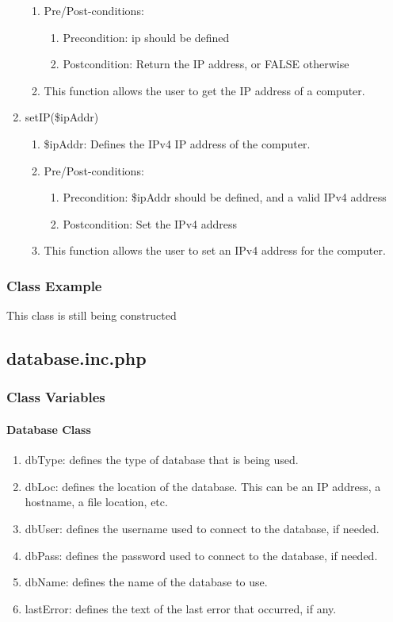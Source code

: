 \documentclass{article}
\begin{document}
\begin{enumerate}
\begin{enumerate}
\item Pre/Post-conditions:
\begin{enumerate}
\item Precondition: ip should be defined
\item Postcondition: Return the IP address, or FALSE otherwise
\end{enumerate}
\item This function allows the user to get the IP address of a computer.
\end{enumerate}
\item setIP(\$ipAddr)
\begin{enumerate}
\item \$ipAddr: Defines the IPv4 IP address of the computer.
\item Pre/Post-conditions:
\begin{enumerate}
\item Precondition: \$ipAddr should be defined, and a valid IPv4 address
\item Postcondition: Set the IPv4 address
\end{enumerate}
\item This function allows the user to set an IPv4 address for the computer.
\end{enumerate}
\end{enumerate}

\newpage

\subsubsection{Class Example}
This class is still being constructed

\newpage

\subsection{database.inc.php}
\subsubsection{Class Variables}
\paragraph{Database Class}
\begin{enumerate}
\item dbType: defines the type of database that is being used.
\item dbLoc: defines the location of the database. This can be an IP address, a hostname, a file location, etc.
\item dbUser: defines the username used to connect to the database, if needed.
\item dbPass: defines the password used to connect to the database, if needed.
\item dbName: defines the name of the database to use.
\item lastError: defines the text of the last error that occurred, if any.
\end{enumerate}
\end{document}
